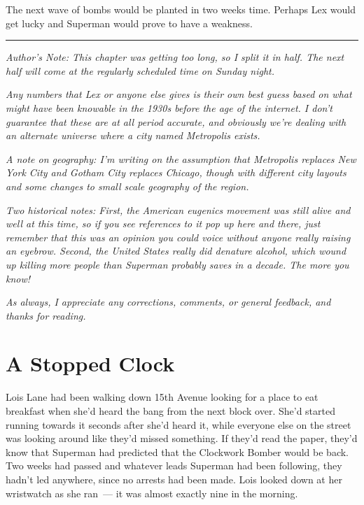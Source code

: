 \documentclass[ebook,12pt]{memoir}
\begin{document}
The next wave of bombs would be planted in two weeks time. Perhaps Lex
would get lucky and Superman would prove to have a weakness.

\begin{center}\rule{0.5\linewidth}{\linethickness}\end{center}

\emph{Author's Note: This chapter was getting too long, so I split it in
half. The next half will come at the regularly scheduled time on Sunday
night.}

\emph{Any numbers that Lex or anyone else gives is their own best guess
based on what might have been knowable in the 1930s before the age of
the internet. I don't guarantee that these are at all period accurate,
and obviously we're dealing with an alternate universe where a city
named Metropolis exists.}

\emph{A note on geography: I'm writing on the assumption that Metropolis
replaces New York City and Gotham City replaces Chicago, though with
different city layouts and some changes to small scale geography of the
region.}

\emph{Two historical notes: First, the American eugenics movement was
still alive and well at this time, so if you see references to it pop up
here and there, just remember that this was an opinion you could voice
without anyone really raising an eyebrow. Second, the United States
really did denature alcohol, which wound up killing more people than
Superman probably saves in a decade. The more you know!}

\emph{As always, I appreciate any corrections, comments, or general
feedback, and thanks for reading.}
\chapter{A Stopped Clock}\label{a-stopped-clock}

Lois Lane had been walking down 15th Avenue looking for a place to eat
breakfast when she'd heard the bang from the next block over. She'd
started running towards it seconds after she'd heard it, while everyone
else on the street was looking around like they'd missed something. If
they'd read the paper, they'd know that Superman had predicted that the
Clockwork Bomber would be back. Two weeks had passed and whatever leads
Superman had been following, they hadn't led anywhere, since no arrests
had been made. Lois looked down at her wristwatch as she ran~--- it was
almost exactly nine in the morning.
\end{document}
